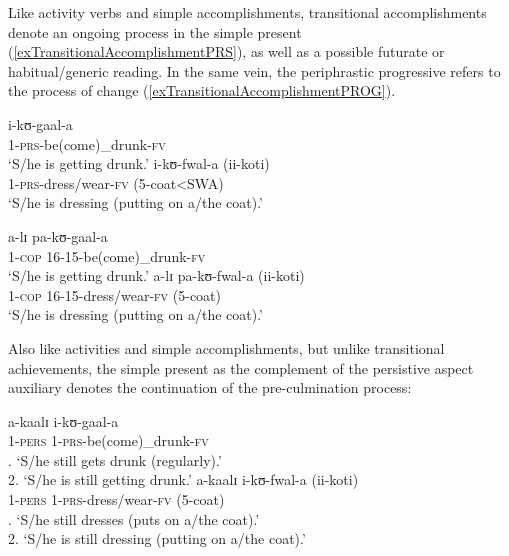Like activity verbs and simple accomplishments, transitional accomplishments denote an ongoing process in the simple present (\ref{exTransitionalAccomplishmentPRS}), as well as a possible futurate or habitual/generic reading. In the same vein, the periphrastic progressive refers to the process of change (\ref{exTransitionalAccomplishmentPROG}).
\begin{exe}
\ex \label{exTransitionalAccomplishmentPRS}
\begin{xlist}
\ex\gll i-kʊ-gaal-a\\
1-\textsc{prs}-be(come)\_drunk-\textsc{fv}\\
\glt `S/he is getting drunk.'
\ex\gll i-kʊ-fwal-a \textup{(}ii-koti\textup{)}\\
1-\textsc{prs}-dress/wear-\textsc{fv} (5-coat<SWA)\\
\glt `S/he is dressing (putting on a/the coat).'
\end{xlist}
\ex \label{exTransitionalAccomplishmentPROG}
\begin{xlist}
\ex\gll a-lɪ pa-kʊ-gaal-a\\
1-\textsc{cop} 16-15-be(come)\_drunk-\textsc{fv}\\
\glt `S/he is getting drunk.'
\ex\gll a-lɪ pa-kʊ-fwal-a \textup{(}ii-koti\textup{)}\\
1-\textsc{cop} 16-15-dress/wear-\textsc{fv} (5-coat)\\
\glt `S/he is dressing (putting on a/the coat).'
\end{xlist}
\end{exe}

\largerpage
Also like activities and simple accomplishments, but unlike transitional achievements, the simple present as the complement of the persistive aspect auxiliary denotes the continuation of the pre-culmination process:
\begin{exe}
\ex\label{exTransitionalAccomplishmentPERSPRS}
\begin{xlist}
\ex\gll a-kaalɪ i-kʊ-gaal-a\\
1-\textsc{pers} 1-\textsc{prs}-be(come)\_drunk-\textsc{fv}\\
. \lq S/he still gets drunk (regularly).'\\
2. \lq S/he is still getting drunk.'
\ex\gll a-kaalɪ i-kʊ-fwal-a \textup{(}ii-koti\textup{)}\\
1-\textsc{pers} 1-\textsc{prs}-dress/wear-\textsc{fv} (5-coat)\\
. \lq S/he still dresses (puts on a/the coat).'\\
2. \lq S/he is still dressing (putting on a/the coat).'
\end{xlist}
\end{exe}

